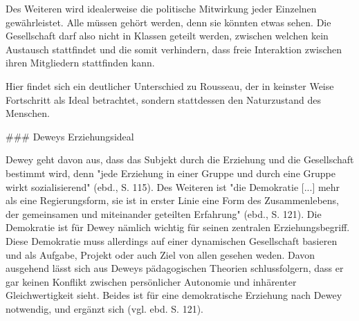 Des Weiteren wird idealerweise die politische Mitwirkung jeder Einzelnen gewährleistet.
Alle müssen gehört werden, denn sie könnten etwas sehen.
Die Gesellschaft darf also nicht in Klassen geteilt werden, zwischen welchen kein Austausch stattfindet und die somit verhindern, dass freie Interaktion zwischen ihren Mitgliedern stattfinden kann.

Hier findet sich ein deutlicher Unterschied zu Rousseau, der in keinster Weise Fortschritt als Ideal betrachtet, sondern stattdessen den Naturzustand des Menschen.

### Deweys Erziehungsideal

Dewey geht davon aus, dass das Subjekt durch die Erziehung und die Gesellschaft bestimmt wird, denn "jede Erziehung in einer Gruppe und durch eine Gruppe wirkt sozialisierend" (ebd., S. 115).
Des Weiteren ist "die Demokratie [...] mehr als eine Regierungsform, sie ist in erster Linie eine Form des Zusammenlebens, der gemeinsamen und miteinander geteilten Erfahrung" (ebd., S. 121).
Die Demokratie ist für Dewey nämlich wichtig für seinen zentralen Erziehungsbegriff.
Diese Demokratie muss allerdings auf einer dynamischen Gesellschaft basieren und als Aufgabe, Projekt oder auch Ziel von allen gesehen weden.
Davon ausgehend lässt sich aus Deweys pädagogischen Theorien schlussfolgern, dass er gar keinen Konflikt zwischen persönlicher Autonomie und inhärenter Gleichwertigkeit sieht.
Beides ist für eine demokratische Erziehung nach Dewey notwendig, und ergänzt sich (vgl. ebd. S. 121).
